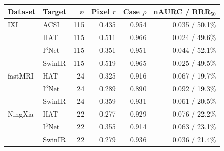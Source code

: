 \begin{tabular}{llrrrr}
\toprule
Dataset & Target & $n$ & Pixel $r$ & Case $\rho$ & nAURC / RRR$_{50}$ \\
\midrule
IXI & ACSI & 115 & 0.435 & 0.954 & 0.035 / 50.1\% \\
 & HAT & 115 & 0.511 & 0.966 & 0.024 / 49.6\% \\
 & I$^3$Net & 115 & 0.351 & 0.951 & 0.044 / 52.1\% \\
 & SwinIR & 115 & 0.519 & 0.965 & 0.025 / 49.5\% \\
fastMRI & HAT & 24 & 0.325 & 0.916 & 0.067 / 19.7\% \\
 & I$^3$Net & 24 & 0.289 & 0.890 & 0.092 / 19.3\% \\
 & SwinIR & 24 & 0.359 & 0.931 & 0.061 / 20.5\% \\
NingXia & HAT & 22 & 0.277 & 0.929 & 0.076 / 22.2\% \\
 & I$^3$Net & 22 & 0.355 & 0.914 & 0.063 / 23.1\% \\
 & SwinIR & 22 & 0.279 & 0.936 & 0.036 / 21.4\% \\
\bottomrule
\end{tabular}
